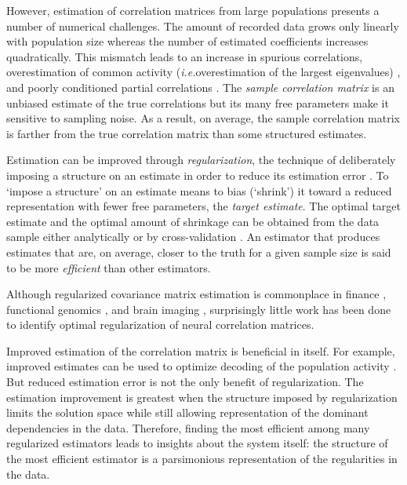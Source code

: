 \documentclass[10pt]{article}
\newcommand{\sq}[1]{\lq#1\rq}
\newcommand{\ie}{\emph{i.e.}\;}
\begin{document}
However, estimation of correlation matrices from large populations presents a number of numerical challenges. The amount of recorded data grows only linearly with population size whereas the number of estimated coefficients increases quadratically. This mismatch leads to an increase in spurious correlations, overestimation of common activity (\ie overestimation of the largest eigenvalues) \cite{Ledoit:2004}, and poorly conditioned partial correlations \cite{Schafer:2005}. The \emph{sample correlation matrix} is an unbiased estimate of the true correlations but its many free parameters make it sensitive to sampling noise. As a result, on average, the sample correlation matrix is farther from the true correlation matrix than some structured estimates. 

Estimation can be improved through \emph{regularization},  the technique of deliberately imposing a structure on an estimate in order to reduce its estimation error \cite{Schafer:2005, Bickel:2006}. To \sq{impose a structure} on an estimate means to bias (\sq{shrink}) it toward a reduced representation  with fewer free parameters, the \emph{target estimate}.   The optimal target estimate and the optimal amount of shrinkage can be obtained from the data sample either analytically \cite{Ledoit:2003, Ledoit:2004, Schafer:2005}  or by cross-validation \cite{Friedman:1989}. An estimator that produces estimates that are, on average, closer to the truth for a given sample size is said to be more \emph{efficient} than other estimators.

Although regularized covariance matrix estimation is commonplace in finance \cite{Ledoit:2003}, functional genomics \cite{Schafer:2005}, and brain imaging \cite{Ryali:2012}, surprisingly little work has been done to identify optimal regularization of neural correlation matrices. 

Improved estimation of the correlation matrix is beneficial in itself. For example, improved estimates can be used to optimize  decoding of the population activity \cite{Friedman:1989}. But reduced estimation error is not the only benefit of regularization.  The estimation improvement is greatest when the structure imposed by regularization limits the solution space while still allowing representation of the dominant dependencies in the data. Therefore, finding the most efficient among many regularized estimators leads to insights about the system itself: the structure of the most efficient estimator is a parsimonious representation of the regularities in the data. 
\end{document}
